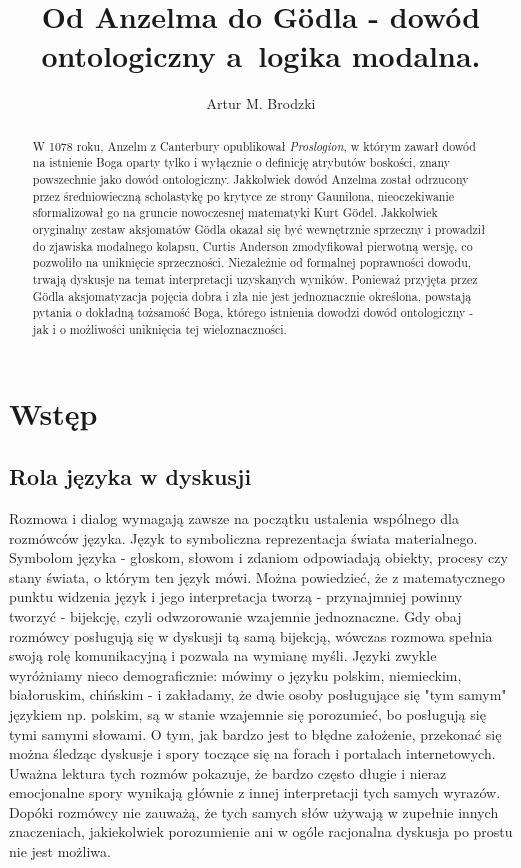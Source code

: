 \documentclass{article}
\title{Od Anzelma do Gödla - dowód ontologiczny a logika modalna.}
\author{Artur M. Brodzki}
\begin{document}
\maketitle

\begin{abstract}
	W 1078 roku, Anzelm z Canterbury opublikował \emph{Proslogion}, w którym zawarł dowód na istnienie Boga oparty tylko i wyłącznie o definicję atrybutów boskości, znany powszechnie jako dowód ontologiczny. Jakkolwiek dowód Anzelma został odrzucony przez średniowieczną scholastykę po krytyce ze strony Gaunilona, nieoczekiwanie sformalizował go na gruncie nowoczesnej matematyki  Kurt Gödel. Jakkolwiek oryginalny zestaw aksjomatów Gödla okazał się być wewnętrznie sprzeczny i prowadził do zjawiska modalnego kolapsu, Curtis Anderson zmodyfikował pierwotną wersję, co pozwoliło na uniknięcie sprzeczności. Niezależnie od formalnej poprawności dowodu, trwają dyskusje na temat interpretacji uzyskanych wyników. Ponieważ przyjęta przez Gödla aksjomatyzacja pojęcia dobra i zła nie jest jednoznacznie określona, powstają pytania o dokładną tożsamość Boga, którego istnienia dowodzi dowód ontologiczny - jak i o możliwości uniknięcia tej wieloznaczności. 
\end{abstract}

\section{Wstęp} \label{sec:intro}

\subsection{Rola języka w dyskusji} \label{sec:language}

Rozmowa i dialog wymagają zawsze na początku ustalenia wspólnego dla rozmówców języka. Język to symboliczna reprezentacja świata materialnego. Symbolom języka - głoskom, słowom i zdaniom odpowiadają obiekty, procesy czy stany świata, o którym ten język mówi. Można powiedzieć, że z matematycznego punktu widzenia język i jego interpretacja tworzą - przynajmniej powinny tworzyć - bijekcję, czyli odwzorowanie wzajemnie jednoznaczne. Gdy obaj rozmówcy posługują się w dyskusji tą samą bijekcją, wówczas rozmowa spełnia swoją rolę komunikacyjną i pozwala na wymianę myśli. Języki zwykle wyróżniamy nieco demograficznie: mówimy o języku polskim, niemieckim, białoruskim, chińskim - i zakładamy, że dwie osoby posługujące się "tym samym" językiem np. polskim, są w stanie wzajemnie się porozumieć, bo posługują się tymi samymi słowami. O tym, jak bardzo jest to błędne założenie, przekonać się można śledząc dyskusje i spory toczące się na forach i portalach internetowych. Uważna lektura tych rozmów pokazuje, że bardzo często długie i nieraz emocjonalne spory wynikają głównie z innej interpretacji tych samych wyrazów. Dopóki rozmówcy nie zauważą, że tych samych słów używają w zupełnie innych znaczeniach, jakiekolwiek porozumienie ani w ogóle racjonalna dyskusja po prostu nie jest możliwa. 
\end{document}
